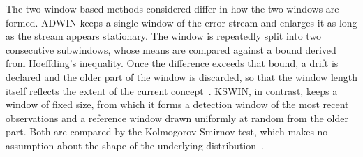%
The two window-based methods considered differ in how the two windows are formed. ADWIN keeps a single window of the error stream and enlarges it as long as the stream appears stationary. The window is repeatedly split into two consecutive subwindows, whose means are compared against a bound derived from Hoeffding's inequality. Once the difference exceeds that bound, a drift is declared and the older part of the window is discarded, so that the window length itself reflects the extent of the current concept~\cite{bifet.2007}. KSWIN, in contrast, keeps a window of fixed size, from which it forms a detection window of the most recent observations and a reference window drawn uniformly at random from the older part. Both are compared by the Kolmogorov-Smirnov test, which makes no assumption about the shape of the underlying distribution~\cite{raab.2020}. \par
%
